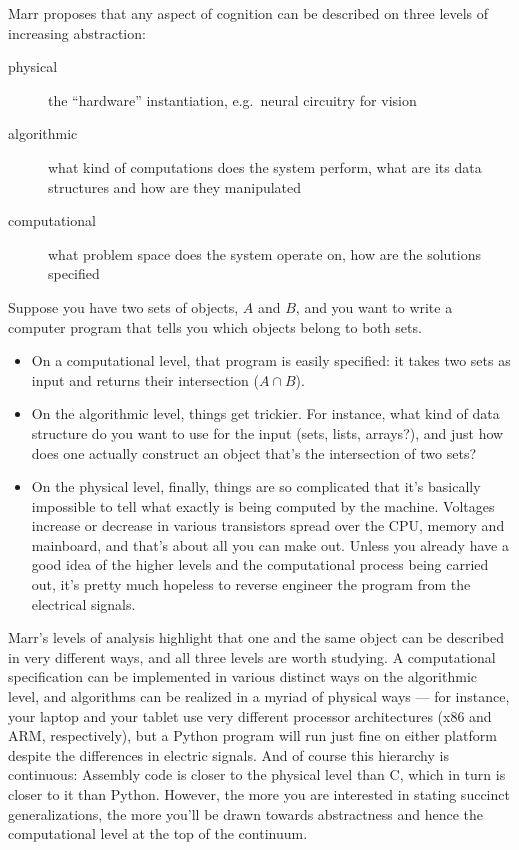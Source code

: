 Marr proposes that any aspect of cognition can be described on three levels of increasing abstraction:
%
\begin{description}
    \item[physical] the ``hardware'' instantiation, e.g.\ neural circuitry for vision
    \item[algorithmic] what kind of computations does the system perform, what are its data structures and how are they manipulated
    \item[computational] what problem space does the system operate on, how are the solutions specified
\end{description}
%
\begin{examplebox}
    Suppose you have two sets of objects, $A$ and $B$, and you want to write a computer program that tells you which objects belong to both sets.
    \begin{itemize}
        \item On a computational level, that program is easily specified: it takes two sets as input and returns their intersection ($A \cap B$).
        \item On the algorithmic level, things get trickier.
        For instance, what kind of data structure do you want to use for the input (sets, lists, arrays?), and just how does one actually construct an object that's the intersection of two sets?
    \item On the physical level, finally, things are so complicated that it's basically impossible to tell what exactly is being computed by the machine.
        Voltages increase or decrease in various transistors spread over the CPU, memory and mainboard, and that's about all you can make out.
        Unless you already have a good idea of the higher levels and the computational process being carried out, it's pretty much hopeless to reverse engineer the program from the electrical signals.
    \end{itemize}
\end{examplebox}
%
Marr's levels of analysis highlight that one and the same object can be described in very different ways, and all three levels are worth studying.
A computational specification can be implemented in various distinct ways on the algorithmic level, and algorithms can be realized in a myriad of physical ways --- for instance, your laptop and your tablet use very different processor architectures (x86 and ARM, respectively), but a Python program will run just fine on either platform despite the differences in electric signals.
And of course this hierarchy is continuous: Assembly code is closer to the physical level than C, which in turn is closer to it than Python.
However, the more you are interested in stating succinct generalizations, the more you'll be drawn towards abstractness and hence the computational level at the top of the continuum.

